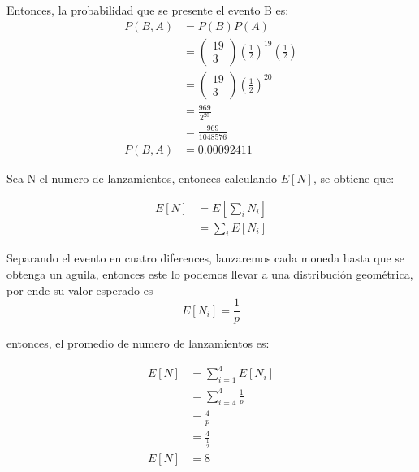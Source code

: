 Entonces, la probabilidad que se presente el evento B es:
\begin{align*}
    P(B,A) & = P(B)P(A)                                                                                    \\
           & =\left(\begin{matrix}
            19 \\
            3
        \end{matrix}\right)\left(\frac{1}{2}\right)^{19} \left(\frac{1}{2}\right) \\
           & =\left(\begin{matrix}
            19 \\
            3
        \end{matrix}\right)\left(\frac{1}{2}\right)^{20}                          \\
           & = \frac{969}{2^{20}}                                                                          \\
           & = \frac{969}{1048576}                                                                         \\
    P(B,A) & = 0.00092411
\end{align*}

Sea N el numero de lanzamientos, entonces calculando $E[N]$, se obtiene que:

\begin{align*}
    E[N] & = E\left[\sum_i N_i\right] \\
         & = \sum_i E[N_i]
\end{align*}

Separando el evento en cuatro diferences, lanzaremos cada moneda hasta que se obtenga un aguila, entonces este lo podemos llevar a una distribución geométrica, por ende su valor esperado es
\begin{equation*}
    E[N_i] = \frac{1}{p}
\end{equation*}

entonces, el promedio de numero de lanzamientos es:

\begin{align*}
    E[N ] & = \sum_{i=1}^4 E[N_i]      \\
          & = \sum_{i=4}^4 \frac{1}{p} \\
          & = \frac{4}{p}              \\
          & = \frac{4}{\frac{1}{2}}    \\
    E[N ] & = 8
\end{align*}


